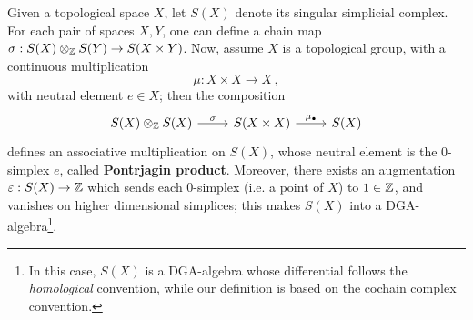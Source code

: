	\begin{ex}
		Given a topological space $X$, let $S(X)$ denote its
		singular simplicial complex. For each pair of spaces $X,Y$,
		one can define a chain map 
		$\sigma : S(X) \otimes_{{\mathbb Z}} S(Y) \to S(X \times Y)$.
		Now, assume $X$ is a topological group, 
		with a continuous multiplication
		\begin{equation*}
			\mu: X \times X \longrightarrow X\,,
		\end{equation*}
		with neutral element $e \in X$;
		then the composition
		\begin{equation*}
			\begin{tikzcd}
				S(X) \otimes_{\Z} S(X) \ar[r, "\sigma"]
				& S(X \times X) \ar[r, "\mu_{\bullet}"]
				& S(X)
			\end{tikzcd}
		\end{equation*}
		defines an associative multiplication on $S(X)$,
		whose neutral element is the $0$-simplex $e$,
		called \textbf{Pontrjagin product}.
		Moreover, there exists an augmentation $\varepsilon : S(X) \to {\mathbb Z}$
		which sends each $0$-simplex (i.e. a point of $X$) to $1 \in {\mathbb Z}$,
		and vanishes on higher dimensional simplices;
		this makes $S(X)$ into a DGA-algebra\footnote{In this case, $S(X)$ is a
		DGA-algebra whose differential follows the \emph{homological} convention,
		while our definition is based on the cochain complex convention.}.
	\end{ex}
	
